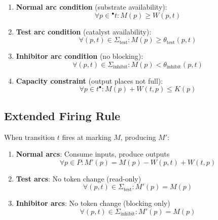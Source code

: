 \begin{enumerate}
\item \textbf{Normal arc condition} (substrate availability):
    \begin{equation}
    \forall p \in {}^\bullet t: M(p) \geq W(p,t)
    \end{equation}

\item \textbf{Test arc condition} (catalyst availability):
    \begin{equation}
    \forall (p,t) \in \Sigma_{\text{test}}: M(p) \geq \theta_{\text{test}}(p,t)
    \end{equation}

\item \textbf{Inhibitor arc condition} (no blocking):
    \begin{equation}
    \forall (p,t) \in \Sigma_{\text{inhibit}}: M(p) < \theta_{\text{inhibit}}(p,t)
    \end{equation}

\item \textbf{Capacity constraint} (output places not full):
    \begin{equation}
    \forall p \in t^\bullet: M(p) + W(t,p) \leq K(p)
    \end{equation}
\end{enumerate}

\subsection{Extended Firing Rule}
\label{subsec:extended-firing-rule}

When transition $t$ fires at marking $M$, producing $M'$:

\begin{enumerate}
\item \textbf{Normal arcs}: Consume inputs, produce outputs
    \begin{equation}
    \forall p \in P: M'(p) = M(p) - W(p,t) + W(t,p)
    \end{equation}

\item \textbf{Test arcs}: No token change (read-only)
    \begin{equation}
    \forall (p,t) \in \Sigma_{\text{test}}: M'(p) = M(p)
    \end{equation}

\item \textbf{Inhibitor arcs}: No token change (blocking only)
    \begin{equation}
    \forall (p,t) \in \Sigma_{\text{inhibit}}: M'(p) = M(p)
    \end{equation}
\end{enumerate}

